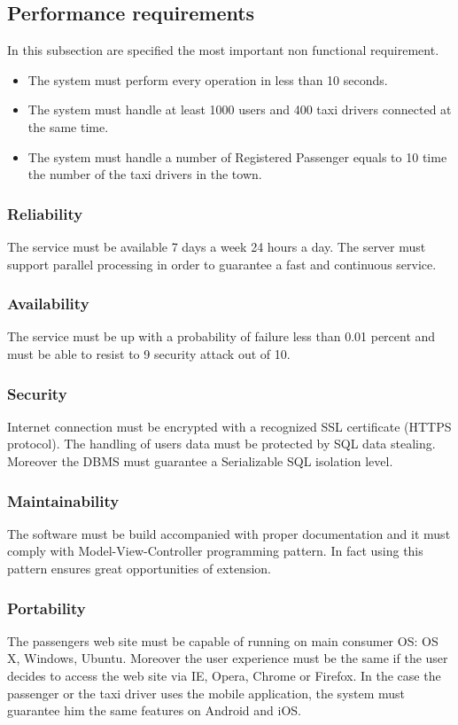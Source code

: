 \subsection{Performance requirements}
In this subsection are specified the most important non functional requirement.
\begin{itemize}
	\item The system must perform every operation in less than 10 seconds.
	\item The system must handle at least 1000 users and 400 taxi drivers connected at the same time.
	\item The system must handle a number of Registered Passenger equals to 10 time the number of the taxi drivers in the town.
\end{itemize}

\subsubsection{Reliability}
The service must be available 7 days a week 24 hours a day.  The server must support parallel processing in order to guarantee a fast and continuous service.
\subsubsection{Availability}

The service must be up with a probability of failure less than 0.01 percent and must be able to resist to 9 security attack out of 10.
\subsubsection{Security}

Internet connection must be encrypted with a recognized SSL certificate (HTTPS protocol). The handling of users data must be protected by SQL data stealing. Moreover the DBMS must guarantee a Serializable SQL isolation level.
\subsubsection{Maintainability}

The software must be build accompanied with proper documentation and it must comply with Model-View-Controller programming pattern. In fact using this pattern ensures great opportunities of extension.

\subsubsection{Portability}
The passengers web site must be capable of running on main consumer OS: OS X, Windows, Ubuntu.
Moreover the user experience must be the same if the user decides to access the web site via IE, Opera, Chrome or Firefox.
In the case the passenger or the taxi driver uses the mobile application, the system must guarantee him the same features on Android and iOS.